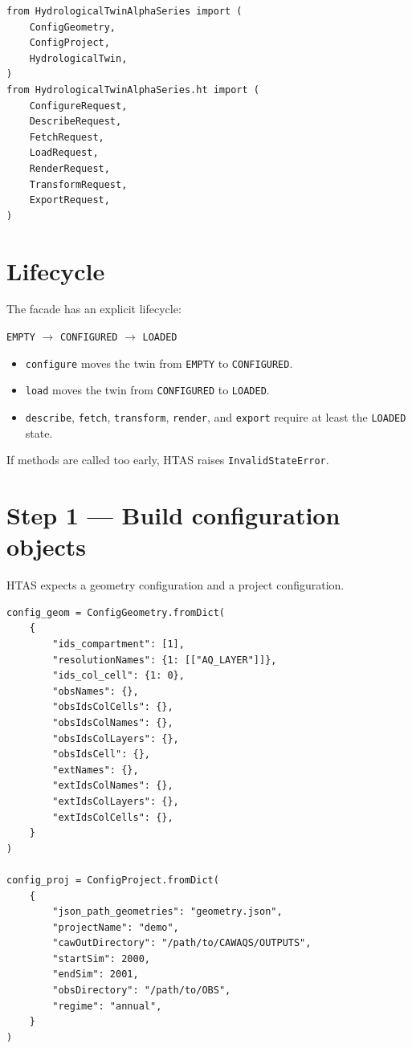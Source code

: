 \documentclass[11pt]{article}
\begin{document}
\begin{verbatim}
from HydrologicalTwinAlphaSeries import (
    ConfigGeometry,
    ConfigProject,
    HydrologicalTwin,
)
from HydrologicalTwinAlphaSeries.ht import (
    ConfigureRequest,
    DescribeRequest,
    FetchRequest,
    LoadRequest,
    RenderRequest,
    TransformRequest,
    ExportRequest,
)
\end{verbatim}

\section{Lifecycle}

The facade has an explicit lifecycle:

\begin{center}
\texttt{EMPTY} $\rightarrow$ \texttt{CONFIGURED} $\rightarrow$ \texttt{LOADED}
\end{center}

\begin{itemize}
    \item \texttt{configure} moves the twin from \texttt{EMPTY} to \texttt{CONFIGURED}.
    \item \texttt{load} moves the twin from \texttt{CONFIGURED} to \texttt{LOADED}.
    \item \texttt{describe}, \texttt{fetch}, \texttt{transform}, \texttt{render}, and
    \texttt{export} require at least the \texttt{LOADED} state.
\end{itemize}

If methods are called too early, HTAS raises \texttt{InvalidStateError}.

\section{Step 1 --- Build configuration objects}

HTAS expects a geometry configuration and a project configuration.

\begin{verbatim}
config_geom = ConfigGeometry.fromDict(
    {
        "ids_compartment": [1],
        "resolutionNames": {1: [["AQ_LAYER"]]},
        "ids_col_cell": {1: 0},
        "obsNames": {},
        "obsIdsColCells": {},
        "obsIdsColNames": {},
        "obsIdsColLayers": {},
        "obsIdsCell": {},
        "extNames": {},
        "extIdsColNames": {},
        "extIdsColLayers": {},
        "extIdsColCells": {},
    }
)

config_proj = ConfigProject.fromDict(
    {
        "json_path_geometries": "geometry.json",
        "projectName": "demo",
        "cawOutDirectory": "/path/to/CAWAQS/OUTPUTS",
        "startSim": 2000,
        "endSim": 2001,
        "obsDirectory": "/path/to/OBS",
        "regime": "annual",
    }
)
\end{verbatim}
\end{document}
